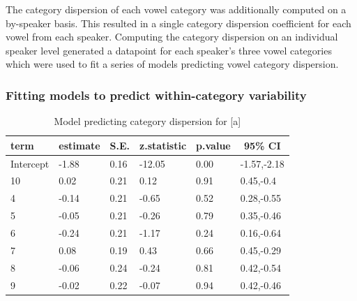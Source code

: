 \documentclass[
]{article}
\begin{document}
The category dispersion of each vowel category was additionally computed on a by-speaker basis. This resulted in a single category dispersion coefficient for each vowel from each speaker. Computing the category dispersion on an individual speaker level generated a datapoint for each speaker's three vowel categories which were used to fit a series of models predicting vowel category dispersion.

\hypertarget{fitting-models-to-predict-within-category-variability}{%
\subsubsection{Fitting models to predict within-category variability}\label{fitting-models-to-predict-within-category-variability}}

\begin{table}[tbp]

\begin{center}
\begin{threeparttable}

\caption{\label{tab:RMS-model-tbl-a}Model predicting category dispersion for [a]}

\begin{tabular}{llllll}
\toprule
term & \multicolumn{1}{c}{estimate} & \multicolumn{1}{c}{S.E.} & \multicolumn{1}{c}{z.statistic} & \multicolumn{1}{c}{p.value} & \multicolumn{1}{c}{95\% CI}\\
\midrule
Intercept & -1.88 & 0.16 & -12.05 & 0.00 & -1.57,-2.18\\
10 & 0.02 & 0.21 & 0.12 & 0.91 & 0.45,-0.4\\
4 & -0.14 & 0.21 & -0.65 & 0.52 & 0.28,-0.55\\
5 & -0.05 & 0.21 & -0.26 & 0.79 & 0.35,-0.46\\
6 & -0.24 & 0.21 & -1.17 & 0.24 & 0.16,-0.64\\
7 & 0.08 & 0.19 & 0.43 & 0.66 & 0.45,-0.29\\
8 & -0.06 & 0.24 & -0.24 & 0.81 & 0.42,-0.54\\
9 & -0.02 & 0.22 & -0.07 & 0.94 & 0.42,-0.46\\
\bottomrule
\end{tabular}

\end{threeparttable}
\end{center}

\end{table}
\end{document}
